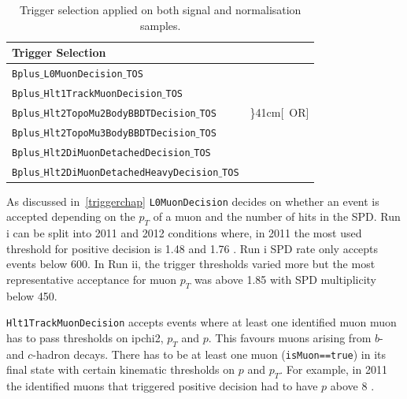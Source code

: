 \begin{table}[h!]
\begin{center}
	\begin{tabular}{ l l}\toprule%
Trigger Selection  \\ %
\hline
		\texttt{Bplus$\_$L0MuonDecision$\_$TOS} \\ %
\hline
		\texttt{Bplus$\_$Hlt1TrackMuonDecision$\_$TOS} \\%
\hline
		\texttt{Bplus$\_$Hlt2TopoMu2BodyBBDTDecision$\_$TOS} & \rdelim\}{4}{1cm}[\ OR]\\ %
		\texttt{Bplus$\_$Hlt2TopoMu3BodyBBDTDecision$\_$TOS} \\ %
		\texttt{Bplus$\_$Hlt2DiMuonDetachedDecision$\_$TOS} \\ %
		\texttt{Bplus$\_$Hlt2DiMuonDetachedHeavyDecision$\_$TOS} \\ %
\bottomrule
\end{tabular}
\end{center}
	\caption{Trigger selection applied on both signal and normalisation samples.}
	\label{tab:triggersel}
\end{table}

As discussed in~\autoref{triggerchap} \texttt{L0MuonDecision} decides on whether an event is accepted depending on the $p_{T}$ of a muon and the number of hits in the \gls{SPD}. Run \Rn{1} can be split into 2011 and 2012 conditions where, in 2011 the most used threshold for positive decision is 1.48 \gevc \cite{Aaij:2012me} and 1.76 \gevc \cite{Albrecht:2013fba}. Run \Rn{1} \gls{SPD} rate only accepts events below 600. In Run \Rn{2}, the trigger thresholds varied more but the most representative acceptance for muon $p_{T}$ was above 1.85 \gevc with \gls{SPD} multiplicity below 450.

\texttt{Hlt1TrackMuonDecision} accepts events where at least one identified muon muon has to pass thresholds on \gls{ipchi2}, $p_{T}$ and $p$. This favours muons arising from $b$- and $c$-hadron decays. There has to be at least one muon (\texttt{isMuon==true}) in its final state with certain kinematic thresholds on $p$ and $p_{T}$. For example, in 2011 the identified muons that triggered positive decision had to have $p$ above 8 \gevc \cite{Aaij:2012me}.

